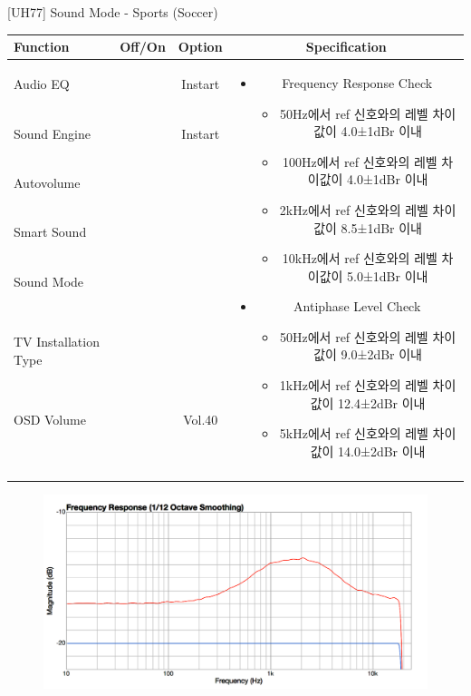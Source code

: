 \begin{frame}[t]{[UH77] Sound Mode - Sports (Soccer)}
\begin{tiny}
\begin{tabular}{@{}lccc@{}}
\toprule
Function & Off/On & Option & Specification \\
\midrule
Audio EQ & \color{black}{Off} & Instart &
\multirow{10}{60mm}{
\begin{itemize}
\item Frequency Response Check
	\begin{itemize}
	\item 50Hz에서 ref 신호와의 레벨 차이값이 4.0±1dBr 이내
	\item 100Hz에서 ref 신호와의 레벨 차이값이 4.0±1dBr 이내
	\item 2kHz에서 ref 신호와의 레벨 차이값이 8.5±1dBr 이내
	\item 10kHz에서 ref 신호와의 레벨 차이값이 5.0±1dBr 이내
	\end{itemize}
\item Antiphase Level Check
	\begin{itemize}
	\item 50Hz에서 ref 신호와의 레벨 차이값이 9.0±2dBr 이내
	\item 1kHz에서 ref 신호와의 레벨 차이값이 12.4±2dBr 이내
	\item 5kHz에서 ref 신호와의 레벨 차이값이 14.0±2dBr 이내
	\end{itemize}
\end{itemize}
} \\
Sound Engine & \color{blue}{On} & Instart & \\
Autovolume & \color{black}{Off} & & \\
Smart Sound & \color{black}{Off} & & \\
Sound Mode & \color{blue}{On} & \color{blue}{Sports} & \\
TV Installation Type & \color{blue}{On} & \color{black}{Standtype1} & \\
OSD Volume & \color{blue}{On} & Vol.40 & \\
& & & \\
& & & \\
& & & \\
& & & \\
\midrule
\end{tabular}
\end{tiny}

\begin{figure}[b]
\includegraphics[height=0.3\textwidth]{figures/sports.png}
\end{figure}

\end{frame}
